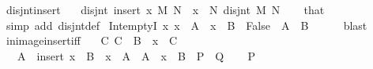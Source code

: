 \begin{isabellebody}
\endisatagproof
{\isafoldproof}%
%
\isadelimproof
\isanewline
%
\endisadelimproof
\isanewline
{}\isamarkupfalse%
\ disjnt{\isacharunderscore}{\kern0pt}insert{\isacharcolon}{\kern0pt}\ \isanewline
\ \ {\isacartoucheopen}disjnt\ {\isacharparenleft}{\kern0pt}insert\ x\ M{\isacharparenright}{\kern0pt}\ N{\isacartoucheclose}\ \ {\isacartoucheopen}x\ {\isasymnotin}\ N{\isacartoucheclose}\ {\isacartoucheopen}disjnt\ M\ N{\isacartoucheclose}\isanewline
%
\isadelimproof
\ \ %
\endisadelimproof
%
\isatagproof
{}\isamarkupfalse%
\ that\ \isamarkupfalse%
\ {\isacharparenleft}{\kern0pt}simp\ add{\isacharcolon}{\kern0pt}\ disjnt{\isacharunderscore}{\kern0pt}def{\isacharparenright}{\kern0pt}%
\endisatagproof
{\isafoldproof}%
%
\isadelimproof
\isanewline
%
\endisadelimproof
\isanewline
{}\isamarkupfalse%
\ Int{\isacharunderscore}{\kern0pt}emptyI{\isacharcolon}{\kern0pt}\ {\isachardoublequoteopen}{\isacharparenleft}{\kern0pt}{\isasymAnd}x{\isachardot}{\kern0pt}\ x\ {\isasymin}\ A\ {\isasymLongrightarrow}\ x\ {\isasymin}\ B\ {\isasymLongrightarrow}\ False{\isacharparenright}{\kern0pt}\ {\isasymLongrightarrow}\ A\ {\isasyminter}\ B\ {\isacharequal}{\kern0pt}\ {\isacharbraceleft}{\kern0pt}{\isacharbraceright}{\kern0pt}{\isachardoublequoteclose}\isanewline
%
\isadelimproof
\ \ %
\endisadelimproof
%
\isatagproof
{}\isamarkupfalse%
\ blast%
\endisatagproof
{\isafoldproof}%
%
\isadelimproof
\isanewline
%
\endisadelimproof
\isanewline
{}\isamarkupfalse%
\ in{\isacharunderscore}{\kern0pt}image{\isacharunderscore}{\kern0pt}insert{\isacharunderscore}{\kern0pt}iff{\isacharcolon}{\kern0pt}\isanewline
\ \ \ {\isachardoublequoteopen}{\isasymAnd}C{\isachardot}{\kern0pt}\ C\ {\isasymin}\ B\ {\isasymLongrightarrow}\ x\ {\isasymnotin}\ C{\isachardoublequoteclose}\isanewline
\ \ \ {\isachardoublequoteopen}A\ {\isasymin}\ insert\ x\ {\isacharbackquote}{\kern0pt}\ B\ {\isasymlongleftrightarrow}\ x\ {\isasymin}\ A\ {\isasymand}\ A\ {\isacharminus}{\kern0pt}\ {\isacharbraceleft}{\kern0pt}x{\isacharbraceright}{\kern0pt}\ {\isasymin}\ B{\isachardoublequoteclose}\ {\isacharparenleft}{\kern0pt}\ {\isachardoublequoteopen}{\isacharquery}{\kern0pt}P\ {\isasymlongleftrightarrow}\ {\isacharquery}{\kern0pt}Q{\isachardoublequoteclose}{\isacharparenright}{\kern0pt}\isanewline
%
\isadelimproof
%
\endisadelimproof
%
\isatagproof
{}\isamarkupfalse%
\isanewline
\ \ \isamarkupfalse%
\ {\isacharquery}{\kern0pt}P\ \isamarkupfalse%

\end{isabellebody}
